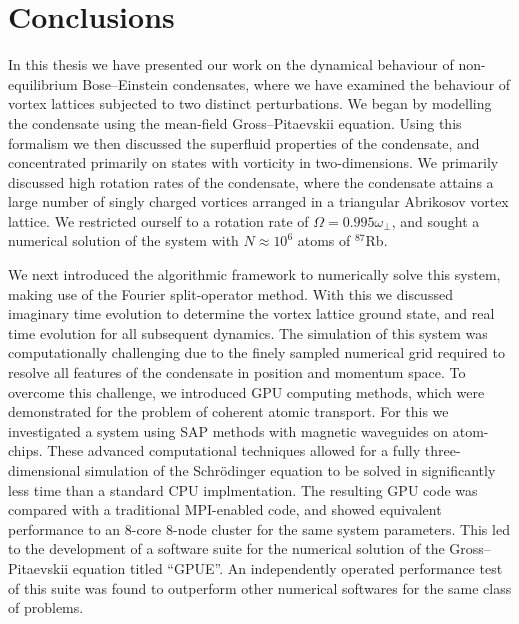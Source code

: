 
\section{Conclusions}
In this thesis we have presented our work on the dynamical behaviour of non-equilibrium Bose--Einstein condensates, where we have examined the behaviour of vortex lattices subjected to two distinct perturbations. We began by modelling the condensate using the mean-field Gross--Pitaevskii equation. Using this formalism we then discussed the superfluid properties of the condensate, and concentrated primarily on states with vorticity in two-dimensions. We primarily discussed high rotation rates of the condensate, where the condensate attains a large number of singly charged vortices arranged in a triangular Abrikosov vortex lattice. We restricted ourself to a rotation rate of $\Omega = 0.995\omega_\perp$, and sought a numerical solution of the system with $N\approx 10^{6}$ atoms of $^{87}$Rb.

We next introduced the algorithmic framework to numerically solve this system, making use of the Fourier split-operator method. With this we discussed imaginary time evolution to determine the vortex lattice ground state, and real time evolution for all subsequent dynamics. The simulation of this system was computationally challenging due to the finely sampled numerical grid required to resolve all features of the condensate in position and momentum space. To overcome this challenge, we introduced GPU computing methods, which were demonstrated for the problem of coherent atomic transport. For this we investigated a system using SAP methods with magnetic waveguides on atom-chips. These advanced computational techniques allowed for a fully three-dimensional simulation of the Schr\"odinger equation to be solved in significantly less time than a standard CPU implmentation. The resulting GPU code was compared with a traditional MPI-enabled code, and showed equivalent performance to an 8-core 8-node cluster for the same system parameters. This led to the development of a software suite for the numerical solution of the Gross--Pitaevskii equation titled ``GPUE''. An independently operated performance test of this suite was found to outperform other numerical softwares for the same class of problems.

